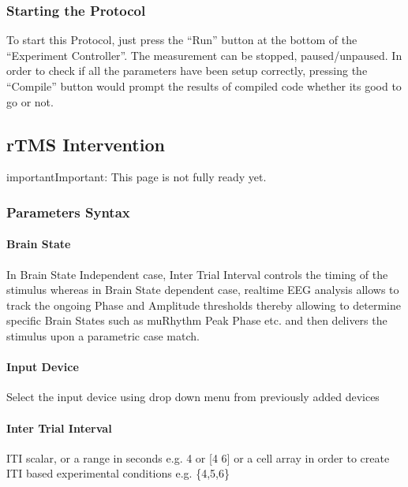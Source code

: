 \documentclass[letterpaper,10pt,english]{sphinxmanual}
\begin{document}
\subsubsection{Starting the Protocol}
\label{\detokenize{11_TEPMeasurement:starting-the-protocol}}
\sphinxAtStartPar
To start this Protocol, just press the “Run” button at the bottom of the “Experiment Controller”. The measurement can be stopped, paused/unpaused. In order to check if all the parameters have been setup correctly, pressing the “Compile” button would prompt the results of compiled code whether its good to go or not.


\subsection{rTMS Intervention}
\label{\detokenize{12_rTMSIntervention:rtms-intervention}}\label{\detokenize{12_rTMSIntervention::doc}}
\begin{sphinxadmonition}{important}{Important:}
\sphinxAtStartPar
This page is not fully ready yet.
\end{sphinxadmonition}


\subsubsection{Parameters Syntax}
\label{\detokenize{12_rTMSIntervention:parameters-syntax}}

\paragraph{Brain State}
\label{\detokenize{12_rTMSIntervention:brain-state}}
\sphinxAtStartPar
In Brain State Independent case, Inter Trial Interval controls the timing of the stimulus whereas in Brain State dependent case, real\sphinxhyphen{}time EEG analysis allows to track the ongoing Phase and Amplitude thresholds thereby allowing to determine specific Brain States such as mu\sphinxhyphen{}Rhythm Peak Phase etc. and then delivers the stimulus upon a parametric case match.


\paragraph{Input Device}
\label{\detokenize{12_rTMSIntervention:input-device}}
\sphinxAtStartPar
Select the input device using drop down menu from previously added devices


\paragraph{Inter Trial Interval}
\label{\detokenize{12_rTMSIntervention:inter-trial-interval}}
\sphinxAtStartPar
ITI scalar, or a range in seconds e.g. 4 or {[}4 6{]} or a cell array in order to create ITI based experimental conditions e.g. \{4,5,6\}
\end{document}

